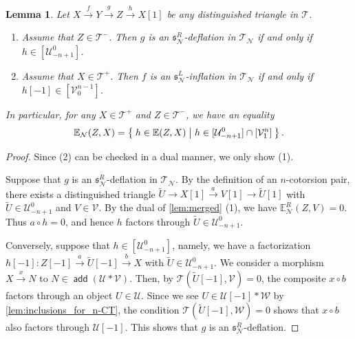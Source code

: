 \documentclass[a4paper,reqno,10pt]{amsart}
\DeclareRobustCommand{\darkblueedit}[1]{#1}
\newtheorem{lemma}[lemma]{Lemma}
\theoremstyle{definition}
\theoremstyle{definition}
\theoremstyle{definition}
\theoremstyle{definition}
\theoremstyle{plain}
\def\add{\operatorname{\mathsf{add}}}
\newcommand{\xto}{\xrightarrow}
\newcommand{\wtil}[1]{\widetilde{#1}}
\newcommand{\fs}{\mathfrak{s}}
\newcommand{\BE}{\mathbb{E}}
\newcommand{\CN}{\mathcal{N}}
\newcommand{\CT}{\mathcal{T}}
\newcommand{\CU}{\mathcal{U}}
\newcommand{\CV}{\mathcal{V}}
\newcommand{\CW}{\mathcal{W}}
\begin{document}
\begin{lemma}\label{lem:char_for_Sn-deflation}
Let $X\xto{f}Y\xto{g}Z\xto{h}X[1]$ be any distinguished triangle in $\CT$.
\begin{enumerate}[label=\textup{(\arabic*)}]
\item 
Assume that $Z\in\CT^-$. Then $g$ is an $\fs_\CN^R$-deflation in $\CT_\CN$ if and only if $h\in[\CU_{-n+1}^0]$.
\item 
Assume that $X\in\CT^+$. Then $f$ is an $\fs_\CN^L$-inflation in $\CT_\CN$ if and only if $h[-1]\in[\CV_0^{n-1}]$.
\end{enumerate}
\darkblueedit{In particular, for any $X\in\CT^+$ and $Z\in\CT^-$, we have an equality}
\[
\BE_\CN(Z,X) 
    =\Set{ h\in\BE(Z,X) | h\in[\CU_{-n+1}^0]\cap [\CV_1^{n}] }.
\]
\end{lemma}
\begin{proof}
Since (2) can be checked in a dual manner, we only show (1).

Suppose that $g$ is an $\fs_\CN^R$-deflation in $\CT_\CN$.
By the definition of an $n$-cotorsion pair, there exists a distinguished triangle $\wtil{U}\xto{}X[1]\xto{a}V[1]\xto{}\wtil{U}[1]$ with $\wtil{U}\in\CU_{-n+1}^0$ and $V\in\CV$.
By the dual of \cref{lem:merged} {\rm (1)}, we have $\BE^R_{\CN}(Z,V)=0$. Thus 
$a\circ h=0$, and hence 
\normalcolor
$h$ factors through $\wtil{U}\in\CU_{-n+1}^0$.

Conversely, suppose that $h\in[\CU_{-n+1}^0]$, namely, we have a factorization $h[-1]\colon Z[-1]\xto{a}\wtil{U}[-1]\xto{b}X$ with $\wtil{U}\in\CU_{-n+1}^0$.
We consider a morphism $X\xto{x}N$ to $N\in\add(\CU*\CV)$.
Then, by $\CT(\wtil{U}[-1],\CV)=0$, the composite $x\circ b$ factors through an object $U\in\CU$.
Since we see $U\in\CU[-1]*\CW$ by \cref{lem:inclusions_for_n-CT}, the condition $\CT(\wtil{U}[-1],\CW)=0$ shows that $x\circ b$ also factors through $\CU[-1]$.
This shows that $g$ is an $\fs_\CN^R$-deflation.
\end{proof}
\end{document}
